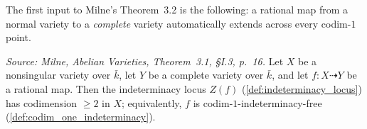 The first input to Milne's Theorem~3.2 is the following: a rational map from a normal
variety to a \emph{complete} variety automatically extends across every codim-\(1\)
point.

\begin{theorem}\leanok
  \label{thm:codim_one_extension}
  \textit{Source: Milne, \emph{Abelian Varieties}, Theorem~3.1, \S I.3, p.~16.}
  Let \(X\) be a nonsingular variety over \(\bar k\), let \(Y\) be a complete variety over
  \(\bar k\), and let \(f \colon X \dashrightarrow Y\) be a rational map. Then the
  indeterminacy locus \(Z(f)\) (\cref{def:indeterminacy_locus}) has codimension
  \(\geq 2\) in \(X\); equivalently, \(f\) is codim-\(1\)-indeterminacy-free
  (\cref{def:codim_one_indeterminacy}).
\end{theorem}

